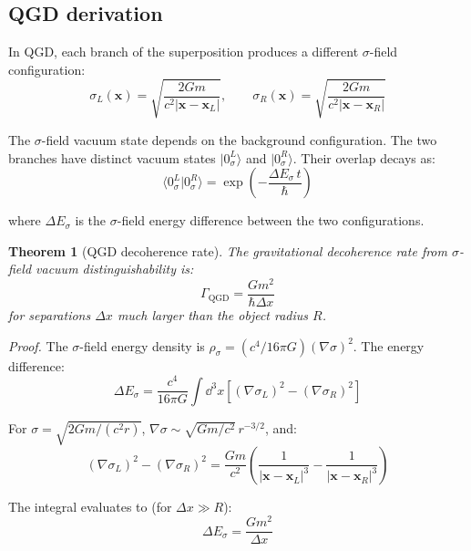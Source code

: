 \documentclass[11pt,a4paper]{article}
\theoremstyle{plain}
\newtheorem{theorem}{Theorem}[section]
\theoremstyle{definition}
\theoremstyle{remark}
\newcommand{\boldx}{\mathbf{x}}
\begin{document}
\subsection{QGD derivation}

In QGD, each branch of the superposition produces a different $\sigma$-field configuration:
\begin{equation}
  \sigma_L(\boldx) = \sqrt{\frac{2Gm}{c^2|\boldx - \boldx_L|}}, \qquad \sigma_R(\boldx) = \sqrt{\frac{2Gm}{c^2|\boldx - \boldx_R|}}
\end{equation}

The $\sigma$-field vacuum state depends on the background configuration.  The two branches have distinct vacuum states $|0_\sigma^L\rangle$ and $|0_\sigma^R\rangle$.  Their overlap decays as:
\begin{equation}
  \langle 0_\sigma^L|0_\sigma^R\rangle = \exp\!\left(-\frac{\Delta E_\sigma\,t}{\hbar}\right)
  \label{eq:overlap}
\end{equation}

where $\Delta E_\sigma$ is the $\sigma$-field energy difference between the two configurations.

\begin{theorem}[QGD decoherence rate]\label{thm:decoherence}
  The gravitational decoherence rate from $\sigma$-field vacuum distinguishability is:
  \begin{equation}
    \boxed{\Gamma_{\mathrm{QGD}} = \frac{Gm^2}{\hbar\Delta x}}
  \end{equation}
  for separations $\Delta x$ much larger than the object radius $R$.
\end{theorem}

\emph{Proof.}  The $\sigma$-field energy density is $\rho_\sigma = (c^4/16\pi G)(\nabla\sigma)^2$.  The energy difference:
\begin{equation}
  \Delta E_\sigma = \frac{c^4}{16\pi G}\int\dd^3x\left[(\nabla\sigma_L)^2 - (\nabla\sigma_R)^2\right]
\end{equation}

For $\sigma = \sqrt{2Gm/(c^2r)}$, $\nabla\sigma \sim \sqrt{Gm/c^2}\,r^{-3/2}$, and:
\begin{equation}
  (\nabla\sigma_L)^2 - (\nabla\sigma_R)^2 = \frac{Gm}{c^2}\left(\frac{1}{|\boldx-\boldx_L|^3} - \frac{1}{|\boldx-\boldx_R|^3}\right)
\end{equation}

The integral evaluates to (for $\Delta x \gg R$):
\begin{equation}
  \Delta E_\sigma = \frac{Gm^2}{\Delta x}
\end{equation}
\end{document}
